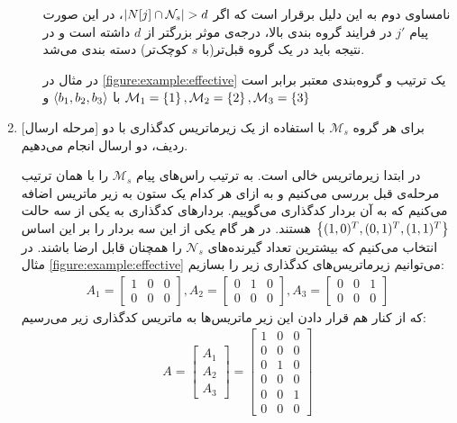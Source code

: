 \begin{enumerate}
\begin{enumerate}
        نامساوی دوم به این دلیل برقرار است که اگر
        $\left|{N[j] \cap \mathcal{N}_s }\right| > d$، در این صورت پیام
        $j'$
        در فرایند گروه بندی بالا، درجه‌ی موثر بزرگتر از
        $d$
        داشته است و در نتیجه باید در یک گروه قبل‌تر(با
        $s$
        کوچک‌تر) دسته بندی می‌شد.

        در مثال در
        \autoref{figure:example:effective}
        یک ترتیب و گروه‌بندی معتبر برابر است با
        $\left< b_1, b_2, b_3 \right>$
        و
        $\mathcal{M}_1 = \left\{ 1 \right\}, \mathcal{M}_2 = \left\{ 2 \right\}, \mathcal{M}_3 = \left\{ 3 \right\}$
    \end{enumerate}
    \item{[مرحله ارسال]}
    برای هر گروه
    $\mathcal{M}_s$
    با استفاده از یک زیرماتریس کدگذاری با دو ردیف، دو ارسال انجام می‌دهیم.

    در ابتدا زیرماتریس خالی است. به ترتیب راس‌های پیام
    $\mathcal{M}_s$
    را با همان ترتیب مرحله‌ی قبل بررسی می‌کنیم و به ازای هر کدام یک ستون به زیر ماتریس اضافه می‌کنیم که به آن بردار کدگذاری می‌گوییم. بردارهای کدگذاری به یکی از سه حالت
    $\left\{ (1, 0)^T, (0, 1)^T, (1, 1)^T \right\}$
    هستند. در هر گام یکی از این سه بردار را بر این اساس انتخاب می‌کنیم که بیشترین تعداد گیرنده‌های
    $\mathcal{N}_s$
    را همچنان قابل ارضا باشند. در مثال
    \autoref{figure:example:effective}
    می‌توانیم زیرماتریس‌های کدگذاری زیر را بسازیم:
    \begin{align*}
        A_1 = \begin{bmatrix}
                  1 & 0 & 0 \\
                  0 & 0 & 0
        \end{bmatrix},
        A_2 =   \begin{bmatrix}
                    0 & 1 & 0 \\
                    0 & 0 & 0
        \end{bmatrix},
        A_3 =   \begin{bmatrix}
                    0 & 0 & 1 \\
                    0 & 0 & 0
        \end{bmatrix}
    \end{align*}
    که از کنار هم قرار دادن این زیر ماتریس‌ها به ماتریس کدگذاری زیر می‌رسیم:
    \begin{align*}
        A =  \begin{bmatrix}
                 A_1 \\
                 A_2 \\
                 A_3
        \end{bmatrix}
        = \begin{bmatrix}
              1 & 0 & 0 \\
              0 & 0 & 0 \\
              0 & 1 & 0 \\
              0 & 0 & 0 \\
              0 & 0 & 1 \\
              0 & 0 & 0
        \end{bmatrix}
    \end{align*}
\end{enumerate}

